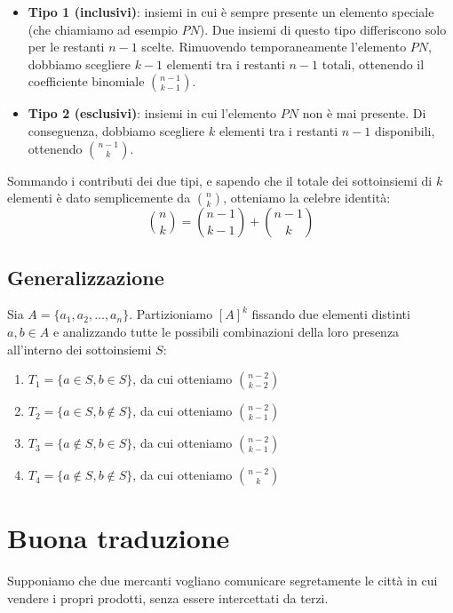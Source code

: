 \documentclass[12pt]{report}
\begin{document}
	\begin{itemize}
		
		\item \textbf{Tipo 1 (inclusivi)}: insiemi in cui è sempre presente un elemento speciale (che chiamiamo ad esempio $PN$). Due insiemi di questo tipo differiscono solo per le restanti $n-1$ scelte. Rimuovendo temporaneamente l'elemento $PN$, dobbiamo scegliere $k-1$ elementi tra i restanti $n-1$ totali, ottenendo il coefficiente binomiale $\binom{n-1}{k-1}$.
		
		\item \textbf{Tipo 2 (esclusivi)}: insiemi in cui l'elemento $PN$ non è mai presente. Di conseguenza, dobbiamo scegliere $k$ elementi tra i restanti $n-1$ disponibili, ottenendo $\binom{n-1}{k}$.
		
	\end{itemize}
	
	Sommando i contributi dei due tipi, e sapendo che il totale dei sottoinsiemi di $k$ elementi è dato semplicemente da $\binom{n}{k}$, otteniamo la celebre identità:
	\[
		\binom{n}{k} = \binom{n-1}{k-1} + \binom{n-1}{k}
	\]
	
	\subsection{Generalizzazione}
	Sia $A = \{a_1, a_2, \dots, a_n\}$. Partizioniamo $[A]^k$ fissando due elementi distinti $a, b \in A$ e analizzando tutte le possibili combinazioni della loro presenza all'interno dei sottoinsiemi $S$:
	
	\begin{enumerate}
		\item $T_1 = \{a \in S, b \in S\}$, da cui otteniamo $\binom{n-2}{k-2}$
		\item $T_2 = \{a \in S, b \notin S\}$, da cui otteniamo $\binom{n-2}{k-1}$
		\item $T_3 = \{a \notin S, b \in S\}$, da cui otteniamo $\binom{n-2}{k-1}$
		\item $T_4 = \{a \notin S, b \notin S\}$, da cui otteniamo $\binom{n-2}{k}$
	\end{enumerate}
	
	\section{Buona traduzione}
	Supponiamo che due mercanti vogliano comunicare segretamente le città in cui vendere i propri prodotti, senza essere intercettati da terzi.
	
\end{document}
